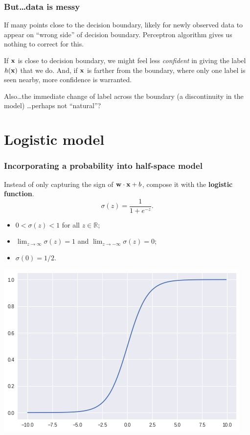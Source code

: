 \documentclass{beamer}
\theoremstyle{example}
\begin{document}
\begin{frame}
\frametitle{But\ldots data is messy}
If many points close to the decision boundary, likely for newly observed data to appear on ``wrong side'' of decision boundary. Perceptron algorithm gives us nothing to correct for this.

\pause
If ${\bf x}$ is close to decision boundary, we might feel less \emph{confident} in giving the label $h({\bf x})$ that we do. And, if ${\bf x}$ is farther from the boundary, where only one label is seen nearby, more confidence is warranted.

\pause
Also\ldots the immediate change of label across the boundary (a discontinuity in the model) \ldots perhaps not ``natural''?
\end{frame}

\section{Logistic model}

\begin{frame}
\frametitle{Incorporating a probability into half-space model}
Instead of only capturing the sign of ${\bf w}\cdot{\bf x} + b$, compose it with the \textbf{logistic function}.    
    \[\sigma(z) = \frac{1}{1+e^{-z}}.\]
\begin{itemize}
    \item $0 < \sigma(z) < 1$ for all $z\in\mathbb R$;
    \item $\lim_{z\to\infty}\sigma(z) = 1$ and $\lim_{z\to-\infty}\sigma(z) = 0$;
    \item $\sigma(0) = 1/2$.
\end{itemize}

\centering
\includegraphics[height=0.3\textheight]{../../Images/logistic_function_graph.png}

\end{frame}
\end{document}
